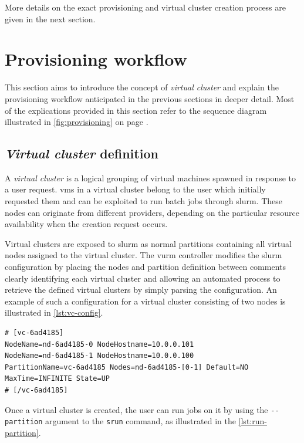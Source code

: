 More details on the exact provisioning and virtual cluster creation process are given in the next section.

\section{Provisioning workflow}
\label{sec:vc-creation}

This section aims to introduce the concept of \emph{virtual cluster} and explain the provisioning workflow anticipated in the previous sections in deeper detail. Most of the explications provided in this section refer to the sequence diagram illustrated in \autoref{fig:provisioning} on page \pageref{fig:provisioning}.

\subsection{\emph{Virtual cluster} definition}

A \emph{virtual cluster} is a logical grouping of virtual machines spawned in response to a user request. \glspl{vm} in a virtual cluster belong to the user which initially requested them and can be exploited to run batch jobs through \gls{slurm}. These nodes can originate from different providers, depending on the particular resource availability when the creation request occurs.

Virtual clusters are exposed to \gls{slurm} as normal partitions containing all virtual nodes assigned to the virtual cluster. The \gls{vurm} controller modifies the \gls{slurm} configuration by placing the nodes and partition definition between comments clearly identifying each virtual cluster and allowing an automated process to retrieve the defined virtual clusters by simply parsing the configuration. An example of such a configuration for a virtual cluster consisting of two nodes is illustrated in \autoref{lst:vc-config}.

\lstset{language=bash,caption=SLURM configuration for a virtual cluster,label=lst:vc-config}
\begin{lstlisting}
# [vc-6ad4185]
NodeName=nd-6ad4185-0 NodeHostname=10.0.0.101
NodeName=nd-6ad4185-1 NodeHostname=10.0.0.100
PartitionName=vc-6ad4185 Nodes=nd-6ad4185-[0-1] Default=NO MaxTime=INFINITE State=UP
# [/vc-6ad4185]
\end{lstlisting}

Once a virtual cluster is created, the user can run jobs on it by using the \texttt{-{}-partition} argument to the \texttt{srun} command, as illustrated in the \autoref{lst:run-partition}.


